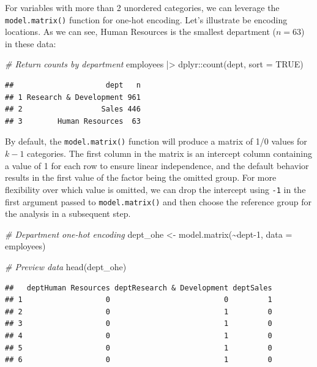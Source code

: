 \documentclass[
]{book}
\newenvironment{Shaded}{\begin{snugshade}}{\end{snugshade}}
\newcommand{\AttributeTok}[1]{\textcolor[rgb]{0.77,0.63,0.00}{#1}}
\newcommand{\CommentTok}[1]{\textcolor[rgb]{0.56,0.35,0.01}{\textit{#1}}}
\newcommand{\ConstantTok}[1]{\textcolor[rgb]{0.00,0.00,0.00}{#1}}
\newcommand{\DecValTok}[1]{\textcolor[rgb]{0.00,0.00,0.81}{#1}}
\newcommand{\FunctionTok}[1]{\textcolor[rgb]{0.00,0.00,0.00}{#1}}
\newcommand{\NormalTok}[1]{#1}
\newcommand{\OtherTok}[1]{\textcolor[rgb]{0.56,0.35,0.01}{#1}}
\newcommand{\SpecialCharTok}[1]{\textcolor[rgb]{0.00,0.00,0.00}{#1}}
\begin{document}
For variables with more than 2 unordered categories, we can leverage the \texttt{model.matrix()} function for one-hot encoding. Let's illustrate be encoding locations. As we can see, Human Resources is the smallest department (\(n = 63\)) in these data:

\begin{Shaded}
\begin{Highlighting}[]
\CommentTok{\# Return counts by department}
\NormalTok{employees }\SpecialCharTok{|\textgreater{}}\NormalTok{ dplyr}\SpecialCharTok{::}\FunctionTok{count}\NormalTok{(dept, }\AttributeTok{sort =} \ConstantTok{TRUE}\NormalTok{)}
\end{Highlighting}
\end{Shaded}

\begin{verbatim}
##                     dept   n
## 1 Research & Development 961
## 2                  Sales 446
## 3        Human Resources  63
\end{verbatim}

By default, the \texttt{model.matrix()} function will produce a matrix of 1/0 values for \(k-1\) categories. The first column in the matrix is an intercept column containing a value of 1 for each row to ensure linear independence, and the default behavior results in the first value of the factor being the omitted group. For more flexibility over which value is omitted, we can drop the intercept using \texttt{-1} in the first argument passed to \texttt{model.matrix()} and then choose the reference group for the analysis in a subsequent step.

\begin{Shaded}
\begin{Highlighting}[]
\CommentTok{\# Department one{-}hot encoding}
\NormalTok{dept\_ohe }\OtherTok{\textless{}{-}} \FunctionTok{model.matrix}\NormalTok{(}\SpecialCharTok{\textasciitilde{}}\NormalTok{dept}\DecValTok{{-}1}\NormalTok{, }\AttributeTok{data =}\NormalTok{ employees)}

\CommentTok{\# Preview data}
\FunctionTok{head}\NormalTok{(dept\_ohe)}
\end{Highlighting}
\end{Shaded}

\begin{verbatim}
##   deptHuman Resources deptResearch & Development deptSales
## 1                   0                          0         1
## 2                   0                          1         0
## 3                   0                          1         0
## 4                   0                          1         0
## 5                   0                          1         0
## 6                   0                          1         0
\end{verbatim}
\end{document}
